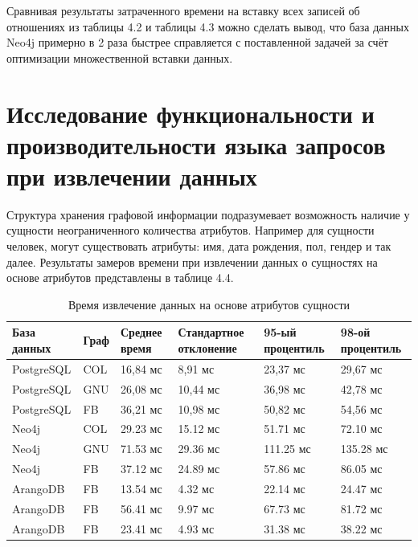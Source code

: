 Сравнивая результаты затраченного времени на вставку всех записей об отношениях из таблицы 4.2 и таблицы 4.3 можно сделать вывод, что база
данных Neo4j примерно в 2 раза быстрее справляется с поставленной задачей за счёт оптимизации множественной вставки данных.


\section{Исследование функциональности и производительности языка запросов при извлечении данных}

Структура хранения графовой информации подразумевает возможность наличие у сущности неограниченного количества атрибутов. Например для
сущности человек, могут существовать атрибуты: имя, дата рождения, пол, гендер и так далее. Результаты замеров времени при извлечении
данных о сущностях на основе атрибутов представлены в таблице 4.4.

\begin{table} [htbp]
    \centering\small
    \caption{Время извлечение данных на основе атрибутов сущности}
    \begin{tabular}{|p{3cm}|p{1cm}|p{2cm}|p{2cm}|p{2cm}|p{2cm}|}
        \hline
        База данных & Граф & Среднее время & Стандартное отклонение & 95-ый процентиль & 98-ой процентиль \\ \hline
        PostgreSQL  & COL  & 16,84 мс      & 8,91 мс                & 23,37 мс         & 29,67 мс         \\ \hline
        PostgreSQL  & GNU  & 26,08 мс      & 10,44 мс               & 36,98 мс         & 42,78 мс         \\ \hline
        PostgreSQL  & FB   & 36,21 мс      & 10,98 мс               & 50,82 мс         & 54,56 мс         \\ \hline
        Neo4j       & COL  & 29.23 мс      & 15.12 мс               & 51.71 мс         & 72.10 мс         \\ \hline
        Neo4j       & GNU  & 71.53 мс      & 29.36 мс               & 111.25 мс        & 135.28 мс        \\ \hline
        Neo4j       & FB   & 37.12 мс      & 24.89 мс               & 57.86 мс         & 86.05 мс         \\ \hline
        ArangoDB    & FB   & 13.54 мс      & 4.32 мс                & 22.14 мс         & 24.47 мс         \\ \hline
        ArangoDB    & FB   & 56.41 мс      & 9.97 мс                & 67.73 мс         & 81.72 мс         \\ \hline
        ArangoDB    & FB   & 23.41 мс      & 4.93 мс                & 31.38 мс         & 38.22 мс         \\ \hline
    \end{tabular}
    \normalsize
\end{table}

